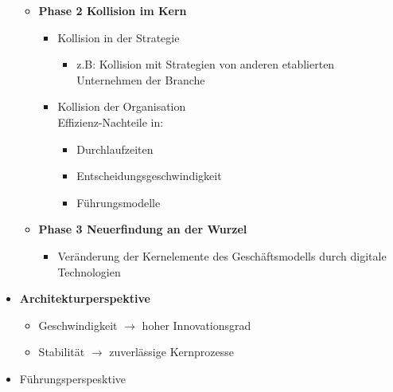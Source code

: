 \documentclass[a4]{scrartcl}
\begin{document}
\begin{itemize}
\begin{itemize}
\begin{itemize}
\end{itemize}

\item \textbf{Phase 2 Kollision im Kern}

\begin{itemize}
\item Kollision in der Strategie

\begin{itemize}
\item z.B: Kollision mit Strategien von anderen etablierten Unternehmen der Branche
\end{itemize}

\item Kollision der Organisation \\
Effizienz-Nachteile in:

\begin{itemize}
\item Durchlaufzeiten
\item Entscheidungsgeschwindigkeit
\item Führungsmodelle
\end{itemize}



\end{itemize}





\item \textbf{Phase 3 Neuerfindung an der Wurzel}

\begin{itemize}
\item Veränderung der Kernelemente des Geschäftsmodells durch digitale Technologien
\end{itemize}

\end{itemize}

\item \textbf{Architekturperspektive}

\begin{itemize}
\item Geschwindigkeit  $\rightarrow$ hoher Innovationsgrad
\item Stabilität $\rightarrow$ zuverlässige Kernprozesse
\end{itemize}



\item Führungsperspesktive
\end{itemize}
\end{document}
